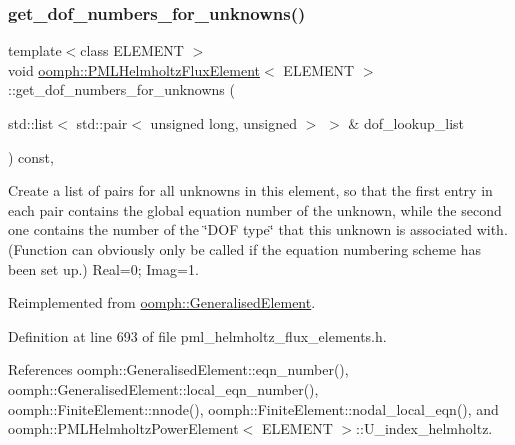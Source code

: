 \subsubsection{\texorpdfstring{get\+\_\+dof\+\_\+numbers\+\_\+for\+\_\+unknowns()}{get\_dof\_numbers\_for\_unknowns()}}
{\footnotesize\ttfamily template$<$class E\+L\+E\+M\+E\+NT $>$ \\
void \hyperlink{classoomph_1_1PMLHelmholtzFluxElement}{oomph\+::\+P\+M\+L\+Helmholtz\+Flux\+Element}$<$ E\+L\+E\+M\+E\+NT $>$\+::get\+\_\+dof\+\_\+numbers\+\_\+for\+\_\+unknowns (\begin{DoxyParamCaption}\item[{std\+::list$<$ std\+::pair$<$ unsigned long, unsigned $>$ $>$ \&}]{dof\+\_\+lookup\+\_\+list }\end{DoxyParamCaption}) const\hspace{0.3cm}{\ttfamily [inline]}, {\ttfamily [virtual]}}



Create a list of pairs for all unknowns in this element, so that the first entry in each pair contains the global equation number of the unknown, while the second one contains the number of the \char`\"{}\+D\+O\+F type\char`\"{} that this unknown is associated with. (Function can obviously only be called if the equation numbering scheme has been set up.) Real=0; Imag=1. 



Reimplemented from \hyperlink{classoomph_1_1GeneralisedElement_a069f59bfc3e607a5bebba52c6314d777}{oomph\+::\+Generalised\+Element}.



Definition at line 693 of file pml\+\_\+helmholtz\+\_\+flux\+\_\+elements.\+h.



References oomph\+::\+Generalised\+Element\+::eqn\+\_\+number(), oomph\+::\+Generalised\+Element\+::local\+\_\+eqn\+\_\+number(), oomph\+::\+Finite\+Element\+::nnode(), oomph\+::\+Finite\+Element\+::nodal\+\_\+local\+\_\+eqn(), and oomph\+::\+P\+M\+L\+Helmholtz\+Power\+Element$<$ E\+L\+E\+M\+E\+N\+T $>$\+::\+U\+\_\+index\+\_\+helmholtz.

\mbox{\label{classoomph_1_1PMLHelmholtzFluxElement_abce15d81e9ea944834ee230fe79aa217}} 
